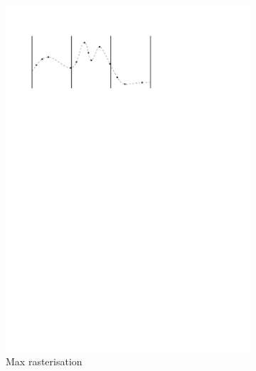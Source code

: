 \begin{figure}
\begin{subfigure}[b]{0.3\linewidth}
    \includegraphics[width=\textwidth,page=2]{figs/maxgridding.pdf}
    \caption{Max rasterisation}\label{fig:fr:mg:a}
  \end{subfigure}
  \qquad
  \begin{subfigure}[b]{0.3\linewidth}
    \centering

\end{subfigure}
\end{figure}
